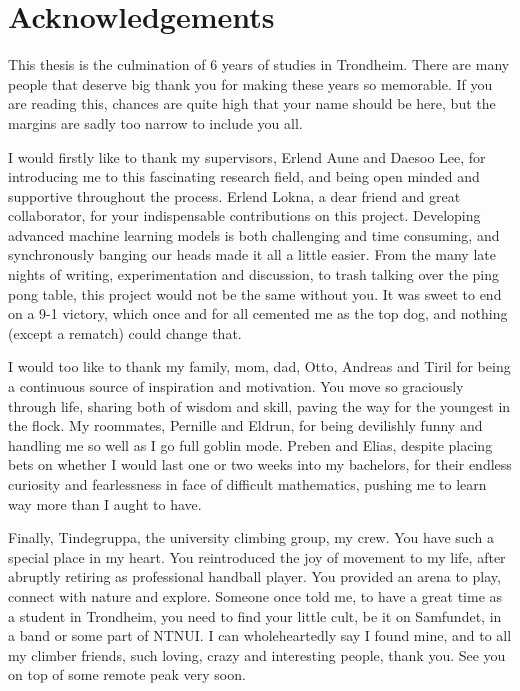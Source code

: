 \documentclass[../../thesis.tex]{subfiles}
\begin{document}

\section{Acknowledgements}
This thesis is the culmination of 6 years of studies in Trondheim. There are many people that deserve big thank you for making these years so memorable. If you are reading this, chances are quite high that your name should be here, but the margins are sadly too narrow to include you all.\newline 

I would firstly like to thank my supervisors, Erlend Aune and Daesoo Lee, for introducing me to this fascinating research field, and being open minded and supportive throughout the process. Erlend Lokna, a dear friend and great collaborator, for your indispensable contributions on this project. Developing advanced machine learning models is both challenging and time consuming, and synchronously banging our heads made it all a little easier. From the many late nights of writing, experimentation and discussion, to trash talking over the ping pong table, this project would not be the same without you. It was sweet to end on a 9-1 victory, which once and for all cemented me as the top dog, and nothing (except a rematch) could change that.\newline

I would too like to thank my family, mom, dad, Otto, Andreas and Tiril for being a continuous source of inspiration and motivation. You move so graciously through life, sharing both of wisdom and skill, paving the way for the youngest in the flock. My roommates, Pernille and Eldrun, for being devilishly funny and handling me so well as I go full goblin mode. Preben and Elias, despite placing bets on whether I would last one or two weeks into my bachelors, for their endless curiosity and fearlessness in face of difficult mathematics, pushing me to learn way more than I aught to have. \newline

Finally, Tindegruppa, the university climbing group, my crew. You have such a special place in my heart. You reintroduced the joy of movement to my life, after abruptly retiring as professional handball player. You provided an arena to play, connect with nature and explore. Someone once told me, to have a great time as a student in Trondheim, you need to find your little cult, be it on Samfundet, in a band or some part of NTNUI. I can wholeheartedly say I found mine, and to all my climber friends, such loving, crazy and interesting people, thank you. See you on top of some remote peak very soon.
\end{document}
